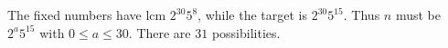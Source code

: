 The fixed numbers have lcm $2^{30}5^8$, while the target is $2^{30}5^{15}$. Thus $n$ must be $2^a5^{15}$ with $0\le a\le30$. There are $\boxed{31}$ possibilities.
